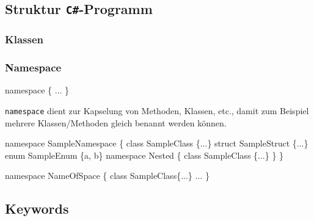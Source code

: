 \documentclass[
  10pt,
  a4paperpaper,
  DIV=11]{scrartcl}
\newenvironment{Shaded}{}{}
\newcommand{\KeywordTok}[1]{\textcolor[rgb]{0.84,0.23,0.29}{#1}}
\newcommand{\NormalTok}[1]{\textcolor[rgb]{0.14,0.16,0.18}{#1}}
\newcommand{\OperatorTok}[1]{\textcolor[rgb]{0.14,0.16,0.18}{#1}}
\numberwithin{equation}{section}
\begin{document}
\hypertarget{struktur-c-programm}{%
\subsection{\texorpdfstring{Struktur
\texttt{C\#}-Programm}{Struktur C\#-Programm}}\label{struktur-c-programm}}

\hypertarget{klassen}{%
\subsubsection{Klassen}\label{klassen}}

\hypertarget{namespace}{%
\subsubsection{Namespace}\label{namespace}}

\begin{Shaded}
\begin{Highlighting}[]
\KeywordTok{namespace} \OperatorTok{\{} \OperatorTok{...} \OperatorTok{\}}
\end{Highlighting}
\end{Shaded}

\texttt{namespace} dient zur Kapselung von Methoden, Klassen, etc.,
damit zum Beispiel mehrere Klassen/Methoden gleich benannt werden
können.

\begin{Shaded}
\begin{Highlighting}[]
\KeywordTok{namespace}\NormalTok{ SampleNamespace }\OperatorTok{\{}
  \KeywordTok{class}\NormalTok{ SampleClass }\OperatorTok{\{...\}}
  \KeywordTok{struct}\NormalTok{ SampleStruct }\OperatorTok{\{...\}}
  \KeywordTok{enum}\NormalTok{ SampleEnum }\OperatorTok{\{}\NormalTok{a}\OperatorTok{,}\NormalTok{ b}\OperatorTok{\}}
  \KeywordTok{namespace}\NormalTok{ Nested }\OperatorTok{\{}
    \KeywordTok{class}\NormalTok{ SampleClass }\OperatorTok{\{...\}}
  \OperatorTok{\}}
\OperatorTok{\}}

\KeywordTok{namespace}\NormalTok{ NameOfSpace }\OperatorTok{\{}
  \KeywordTok{class}\NormalTok{ SampleClass}\OperatorTok{\{...\}}
  \OperatorTok{...}
\OperatorTok{\}}
\end{Highlighting}
\end{Shaded}

\hypertarget{keywords}{%
\subsection{Keywords}\label{keywords}}
\end{document}
